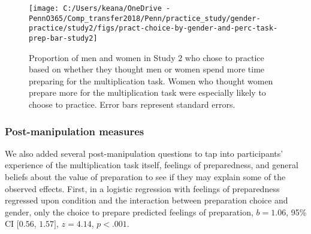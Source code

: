 \documentclass[letterpaper, nobind]{templates/ociamthesis}
\begin{document}
\begin{figure}

{\centering \texttt{[image: C:/Users/keana/OneDrive - PennO365/Comp\_transfer2018/Penn/practice\_study/gender-practice/study2/figs/pract-choice-by-gender-and-perc-task-prep-bar-study2]} 

}

\caption{Proportion of men and women in Study 2 who chose to practice based on whether they thought men or women spend more time preparing for the multiplication task. Women who thought women prepare more for the multiplication task were especially likely to choose to practice. Error bars represent standard errors.}\label{fig:pract-choice-by-gender-and-perc-task-prep-bar-study2}
\end{figure}

\hypertarget{post-manipulation-measures}{%
\subsubsection{Post-manipulation measures}\label{post-manipulation-measures}}

We also added several post-manipulation questions to tap into participants' experience of the multiplication task itself, feelings of preparedness, and general beliefs about the value of preparation to see if they may explain some of the observed effects. First, in a logistic regression with feelings of preparedness regressed upon condition and the interaction between preparation choice and gender, only the choice to prepare predicted feelings of preparation, \(b = 1.06\), 95\% CI \([0.56\), \(1.57]\), \(z = 4.14\), \(p < .001\).
\end{document}
